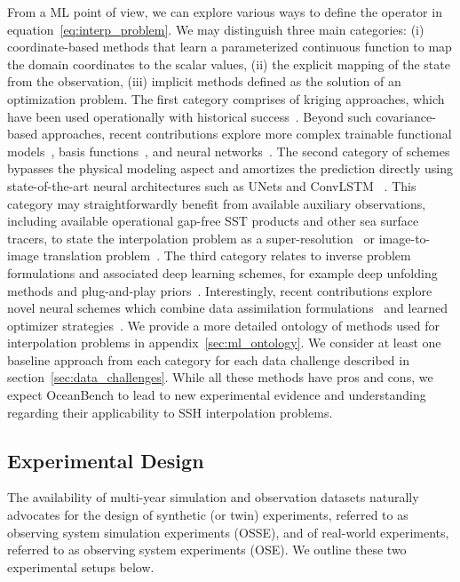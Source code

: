 From a ML point of view, we can explore various ways to define the operator in equation~\eqref{eq:interp_problem}. 
We may distinguish three main categories: (i) coordinate-based methods that learn a parameterized continuous function to map the domain coordinates to the scalar values, (ii) the explicit mapping of the state from the observation, (iii) implicit methods defined as the solution of an optimization problem. 
The first category comprises of kriging approaches, which have been used operationally with historical success~\cite{KRIGINGREVIEW,DUACS}. Beyond such covariance-based approaches, recent contributions explore more complex trainable functional models~\cite{GPsBIGDATA}, basis functions~\cite{MIOST}, and neural networks~\cite{NERFSSSH}. 
The second category of schemes bypasses the physical modeling aspect and amortizes the prediction directly using state-of-the-art neural architectures such as UNets and ConvLSTM ~\cite{SSHInterpAttention, SSHInterpConvLSTM, SSHInterpUNet}. 
This category may straightforwardly benefit from available auxiliary observations, including available operational gap-free SST products and other sea surface tracers, to state the interpolation problem as a super-resolution~\cite{SuperResSurvey} or image-to-image translation problem~\cite{IMAGE2IMAGETRANSLATION, IMAGE2IMAGETRANSLATION2}. 
The third category relates to inverse problem formulations and associated deep learning schemes, for example deep unfolding methods and plug-and-play priors~\cite{DEEPUNFOLDING}. 
Interestingly, recent contributions explore novel neural schemes which combine data assimilation formulations~\cite{DAGEOSCIENCE} and learned optimizer strategies~\cite{4DVARNETSWOT,4DVARNETSST}.
We provide a more detailed ontology of methods used for interpolation problems in appendix~\ref{sec:ml_ontology}. 
We consider at least one baseline approach from each category for each data challenge described in section~\ref{sec:data_challenges}. 
While all these methods have pros and cons, we expect OceanBench to lead to new experimental evidence and understanding regarding their applicability to SSH interpolation problems.
 

\subsection{Experimental Design} \label{sec:experimental_design}

The availability of multi-year simulation and observation datasets naturally advocates for the design of synthetic (or twin) experiments, referred to as observing system simulation experiments (OSSE), and of real-world experiments, referred to as observing system experiments (OSE).
We outline these two experimental setups below.

